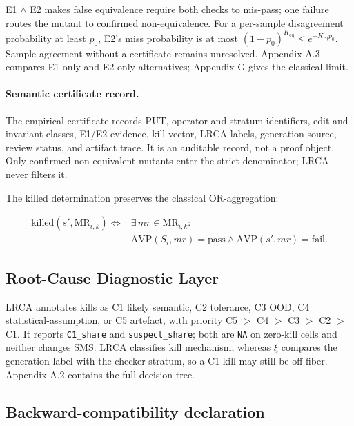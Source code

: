 \documentclass[manuscript,screen,review]{acmart}
\begin{document}
E1 $\wedge$ E2 makes false equivalence require both checks to mis-pass;
one failure routes the mutant to confirmed non-equivalence. For a
per-sample disagreement probability at least \(p_0\), E2's miss
probability is at most
\((1-p_0)^{K_{\mathrm{eq}}}\leq e^{-K_{\mathrm{eq}}p_0}\).
Sample agreement without a certificate remains unresolved. Appendix A.3
compares E1-only and E2-only alternatives; Appendix G gives the
classical limit.

\paragraph{Semantic certificate record.}
The empirical certificate records PUT, operator and stratum identifiers,
edit and invariant classes, E1/E2 evidence, kill vector, LRCA labels,
generation source, review status, and artifact trace. It is an auditable
record, not a proof object. Only confirmed non-equivalent mutants enter
the strict denominator; LRCA never filters it.

The killed determination preserves the classical OR-aggregation:

\[
\begin{aligned}
\mathrm{killed}(s', \mathrm{MR}_{i,k}) \iff{} & \exists\,mr \in \mathrm{MR}_{i,k}: \\
& \mathrm{AVP}(S_i, mr) = \text{pass} \wedge
  \mathrm{AVP}(s', mr) = \text{fail}.
\end{aligned}
\]

\subsection{Root-Cause Diagnostic Layer}\label{lrca-engineering-attribution-layer-descriptive-not-in-sms}

LRCA annotates kills as C1 likely semantic, C2 tolerance, C3 OOD, C4
statistical-assumption, or C5 artefact, with priority
C5 \(>\) C4 \(>\) C3 \(>\) C2 \(>\) C1. It reports
\texttt{C1\_share} and \texttt{suspect\_share}; both are \texttt{NA} on
zero-kill cells and neither changes SMS. LRCA classifies kill mechanism,
whereas \(\xi\) compares the generation label with the checker stratum,
so a C1 kill may still be off-fiber. Appendix A.2 contains the full
decision tree.

\subsection{Backward-compatibility declaration}\label{backward-compatibility-declaration}
\end{document}
